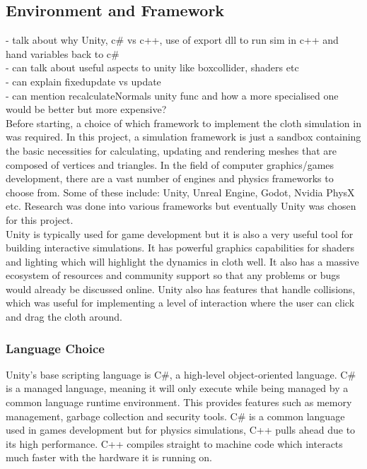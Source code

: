 \documentclass[12pt,a4paper]{article}
\begin{document}
\subsection{Environment and Framework}
- talk about why Unity, c\# vs c++, use of export dll to run sim in c++ and hand variables back to c\#\\
- can talk about useful aspects to unity like boxcollider, shaders etc\\
- can explain fixedupdate vs update\\
- can mention recalculateNormals unity func and how a more specialised one would be better but more expensive? \\

Before starting, a choice of which framework to implement the cloth simulation in was required. In this project, a simulation framework is just a sandbox containing the basic necessities for calculating, updating and rendering meshes that are composed of vertices and triangles. In the field of computer graphics/games development, there are a vast number of engines and physics frameworks to choose from. Some of these include: Unity, Unreal Engine, Godot, Nvidia PhysX etc. Research was done into various frameworks but eventually Unity was chosen for this project. \\

Unity is typically used for game development but it is also a very useful tool for building interactive simulations. It has powerful graphics capabilities for shaders and lighting which will highlight the dynamics in cloth well. It also has a massive ecosystem of resources and community support so that any problems or bugs would already be discussed online. Unity also has features that handle collisions, which was useful for implementing a level of interaction where the user can click and drag the cloth around.

\subsubsection{Language Choice}
Unity's base scripting language is C\#, a high-level object-oriented language. C\# is a managed language, meaning it will only execute while being managed by a common language runtime environment. This provides features such as memory management, garbage collection and security tools. C\# is a common language used in games development but for physics simulations, C++ pulls ahead due to its high performance. C++ compiles straight to machine code which interacts much faster with the hardware it is running on. \\
\end{document}
